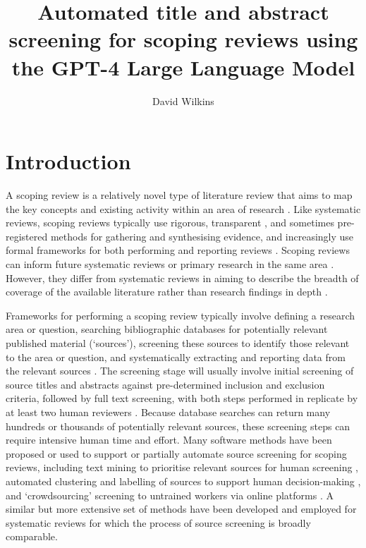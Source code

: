 \documentclass[10pt,a4paper,twocolumn]{article}
\begin{document}
\title{Automated title and abstract screening for scoping reviews using the GPT-4 Large Language Model}
\author{David Wilkins}
\maketitle

\section{Introduction}

A scoping review is a relatively novel type of literature review that aims to map the key concepts and existing activity within an area of research \cite{Arksey.2005}. Like systematic reviews, scoping reviews typically use rigorous, transparent \cite{Pham.2014}, and sometimes pre-registered methods for gathering and synthesising evidence, and increasingly use formal frameworks for both performing and reporting reviews \cite{Peters.2021}. Scoping reviews can inform future systematic reviews or primary research in the same area \cite{Sutton.2019}. However, they differ from systematic reviews in aiming to describe the breadth of coverage of the available literature rather than research findings in depth \cite{Arksey.2005}.

Frameworks for performing a scoping review typically involve defining a research area or question, searching bibliographic databases for potentially relevant published material (`sources'), screening these sources to identify those relevant to the area or question, and systematically extracting and reporting data from the relevant sources \cite{JBI.2015, Arksey.2005}. The screening stage will usually involve initial screening of source titles and abstracts against pre-determined inclusion and exclusion criteria, followed by full text screening, with both steps performed in replicate by at least two human reviewers \cite{Peters.2020, JBI.2020, Pham.2014}. Because database searches can return many hundreds or thousands of potentially relevant sources, these screening steps can require intensive human time and effort. Many software methods have been proposed or used to support or partially automate source screening for scoping reviews, including text mining to prioritise relevant sources for human screening \cite{Shemilt.2014, Howard.2016, Chai.2021}, automated clustering and labelling of sources to support human decision-making \cite{Stansfield.2013}, and `crowdsourcing' screening to untrained workers via online platforms \cite{Mortensen.2017}. A similar but more extensive set of methods have been developed and employed for systematic reviews \cite{Khalil.2022, Gates.2019} for which the process of source screening is broadly comparable.
\end{document}

